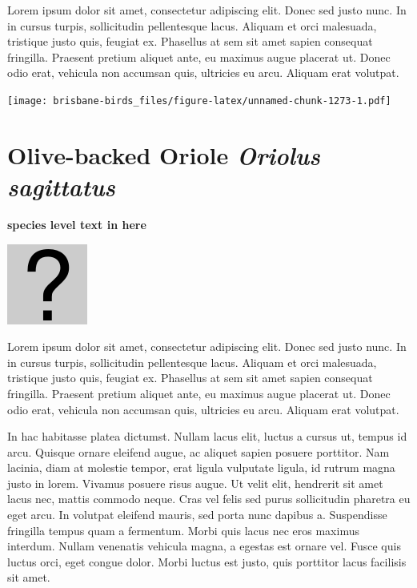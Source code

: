 \documentclass[]{book}
\let\origfigure\figure
\let\endorigfigure\endfigure
\renewenvironment{figure}[1][2] {
  \expandafter\origfigure\expandafter[H]
} {
  \endorigfigure
}
\begin{document}
Lorem ipsum dolor sit amet, consectetur adipiscing elit. Donec sed justo
nunc. In in cursus turpis, sollicitudin pellentesque lacus. Aliquam et
orci malesuada, tristique justo quis, feugiat ex. Phasellus at sem sit
amet sapien consequat fringilla. Praesent pretium aliquet ante, eu
maximus augue placerat ut. Donec odio erat, vehicula non accumsan quis,
ultricies eu arcu. Aliquam erat volutpat.

\texttt{[image: brisbane-birds\_files/figure-latex/unnamed-chunk-1273-1.pdf]}

\section{\texorpdfstring{Olive-backed Oriole \emph{Oriolus
sagittatus}}{Olive-backed Oriole Oriolus sagittatus}}\label{olive-backed-oriole-oriolus-sagittatus}

\textbf{species level text in here}

\begin{figure}
\centering
\includegraphics{assets/missing.png}
\caption{No image for species}
\end{figure}

Lorem ipsum dolor sit amet, consectetur adipiscing elit. Donec sed justo
nunc. In in cursus turpis, sollicitudin pellentesque lacus. Aliquam et
orci malesuada, tristique justo quis, feugiat ex. Phasellus at sem sit
amet sapien consequat fringilla. Praesent pretium aliquet ante, eu
maximus augue placerat ut. Donec odio erat, vehicula non accumsan quis,
ultricies eu arcu. Aliquam erat volutpat.

In hac habitasse platea dictumst. Nullam lacus elit, luctus a cursus ut,
tempus id arcu. Quisque ornare eleifend augue, ac aliquet sapien posuere
porttitor. Nam lacinia, diam at molestie tempor, erat ligula vulputate
ligula, id rutrum magna justo in lorem. Vivamus posuere risus augue. Ut
velit elit, hendrerit sit amet lacus nec, mattis commodo neque. Cras vel
felis sed purus sollicitudin pharetra eu eget arcu. In volutpat eleifend
mauris, sed porta nunc dapibus a. Suspendisse fringilla tempus quam a
fermentum. Morbi quis lacus nec eros maximus interdum. Nullam venenatis
vehicula magna, a egestas est ornare vel. Fusce quis luctus orci, eget
congue dolor. Morbi luctus est justo, quis porttitor lacus facilisis sit
amet.
\end{document}
